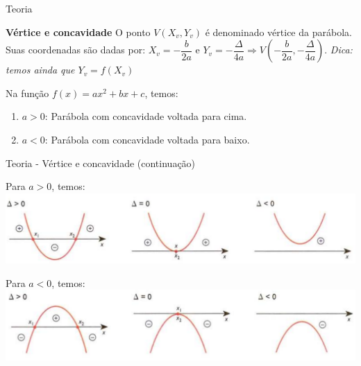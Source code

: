 \documentclass[11pt]{beamer}
\begin{document}
\begin{frame}{Teoria}

    \begin{block}{\textbf{Vértice e concavidade}}
        O ponto $V(X_{v}, Y_{v})$ é denominado vértice da parábola. Suas coordenadas são dadas por: $X_{v}=-\dfrac{b}{2a}$ e $Y_{v}=-\dfrac{\Delta}{4a} \Rightarrow  V \left ( -\dfrac{b}{2a}, -\dfrac{\Delta}{4a} \right )$. \textit{Dica: temos ainda que $Y_{v}=f(X_{v})$}
    \end{block}

    \pause 
    
    \begin{block}{}
        Na função $f(x)=ax^{2}+bx+c$, temos:

        \begin{enumerate}[I]
            \item $a > 0$: Parábola com concavidade voltada para cima.
            \item $a < 0$: Parábola com concavidade voltada para baixo.
        \end{enumerate}
    \end{block}
    
\end{frame}

\begin{frame}{Teoria - Vértice e concavidade (continuação)}

    \begin{block}{Para $a>0$, temos:}
        \includegraphics[scale=0.27]{imagens/func1.png}
    \end{block}

    \pause
    
    \begin{block}{Para $a<0$, temos:}
        \includegraphics[scale=0.27]{imagens/func2.png}
    \end{block}
\end{frame}
\end{document}
